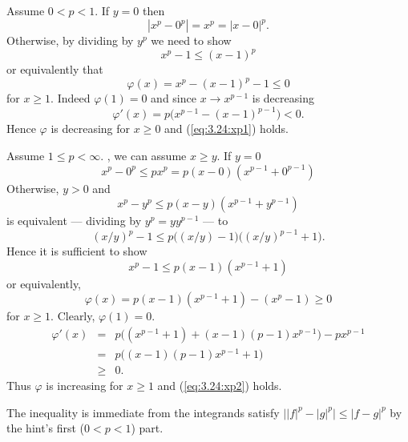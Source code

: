 \begin{enumerate}
Assume \(0 < p < 1\). If \(y=0\) then
\begin{equation*}
 |x^p - 0^p| = x^p = |x-0|^p.
\end{equation*}
Otherwise, by dividing by \(y^p\) we need to show
\begin{equation} \label{eq:3.24:xp1}
 x^p - 1 \leq (x-1)^p
\end{equation}
or equivalently that
\begin{equation*}
 \varphi(x) = x^p - (x-1)^p - 1 \leq 0
\end{equation*}
for \(x\geq 1\).
Indeed \(\varphi(1) = 0\) and since \(x\to x^{p-1}\) is decreasing
\begin{equation*}
\varphi'(x) = p\bigl(x^{p-1} - (x-1)^{p-1}\bigr) < 0.
\end{equation*}
Hence \(\varphi\) is decreasing for \(x\geq 0\) and (\ref{eq:3.24:xp1}) holds.

Assume \(1\leq p < \infty\). \Wlogy, we can assume \(x\geq y\).
If \(y=0\)
\begin{equation*}
 x^p - 0^p \leq px^p = p(x-0)(x^{p-1} + 0^{p-1})
\end{equation*}
Otherwise, \(y>0\) and
\begin{equation*}
 x^p - y^p \leq p(x-y)(x^{p-1} + y^{p-1})
\end{equation*}
is equivalent --- dividing by \(y^p=yy^{p-1}\) --- to
\begin{equation*}
 (x/y)^p - 1 \leq p\bigl((x/y)-1\bigr)\bigl((x/y)^{p-1} + 1).
\end{equation*}
Hence it is sufficient to show
\begin{equation} \label{eq:3.24:xp2}
 x^p - 1 \leq p(x-1)(x^{p-1} + 1)
\end{equation}
or equivalently,
\begin{equation*}
 \varphi(x) = p(x-1)(x^{p-1} + 1) - (x^p - 1) \geq 0
\end{equation*}
for \(x\geq 1\). Clearly, \(\varphi(1) = 0\).
\begin{eqnarray*}
 \varphi'(x)
 &=& p\bigl( (x^{p-1} + 1) + (x-1)(p-1)x^{p-1} \bigr) - px^{p-1} \\
 &=& p\bigl( (x-1)(p-1)x^{p-1} + 1 \bigr) \\
 &\geq& 0.
\end{eqnarray*}
Thus \(\varphi\) is increasing for \(x\geq 1\) and  (\ref{eq:3.24:xp2}) holds.



\begin{itemize}
 The inequality is immediate from the integrands satisfy
 \(\bigl| |f|^p - |g|^p \bigr| \leq |f - g|^p\)
 by the hint's first (\(0<p<1\)) part.


\end{itemize}
\end{enumerate}
